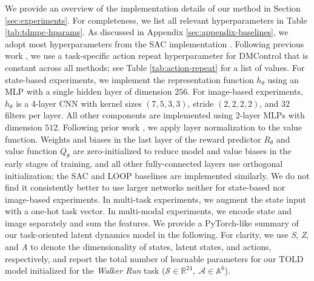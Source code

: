 \documentclass{article}
\begin{document}
We provide an overview of the implementation details of our method in Section \ref{sec:experiments}. For completeness, we list all relevant hyperparameters in Table \ref{tab:tdmpc-hparams}. As discussed in Appendix \ref{sec:appendix-baselines}, we adopt most hyperparameters from the SAC implementation \citep{pytorch_sac}. Following previous work \citep{hafner2019planet}, we use a task-specific action repeat hyperparameter for DMControl that is constant across all methods; see Table \ref{tab:action-repeat} for a list of values. For state-based experiments, we implement the representation function $h_{\theta}$ using an MLP with a single hidden layer of dimension $256$. For image-based experiments, $h_{\theta}$ is a 4-layer CNN with kernel sizes $(7,5,3,3)$, stride $(2,2,2,2)$, and $32$ filters per layer. All other components are implemented using 2-layer MLPs with dimension $512$. Following prior work \citep{pytorch_sac, srinivas2020curl, kostrikov2020image}, we apply layer normalization to the value function. Weights and biases in the last layer of the reward predictor $R_{\theta}$ and value function $Q_{\theta}$ are zero-initialized to reduce model and value biases in the early stages of training, and all other fully-connected layers use orthogonal initialization; the SAC and LOOP baselines are implemented similarly. We do not find it consistently better to use larger networks neither for state-based nor image-based experiments. In multi-task experiments, we augment the state input with a one-hot task vector. In multi-modal experiments, we encode state and image separately and sum the features. We provide a PyTorch-like summary of our task-oriented latent dynamics model in the following. For clarity, we use \emph{S}, \emph{Z}, and \emph{A} to denote the dimensionality of states, latent states, and actions, respectively, and report the total number of learnable parameters for our TOLD model initialized for the \textit{Walker Run} task ($\mathcal{S} \in \mathbb{R}^{24},~\mathcal{A} \in \mathbb{A}^{6}$).
\end{document}
